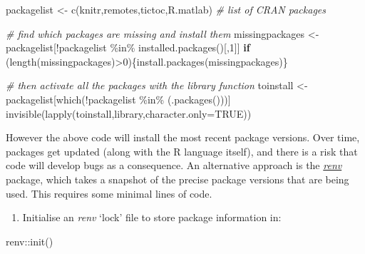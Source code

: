 \documentclass[
]{article}
\newenvironment{Shaded}{\begin{snugshade}}{\end{snugshade}}
\newcommand{\AttributeTok}[1]{\textcolor[rgb]{0.77,0.63,0.00}{#1}}
\newcommand{\CommentTok}[1]{\textcolor[rgb]{0.56,0.35,0.01}{\textit{#1}}}
\newcommand{\ConstantTok}[1]{\textcolor[rgb]{0.00,0.00,0.00}{#1}}
\newcommand{\ControlFlowTok}[1]{\textcolor[rgb]{0.13,0.29,0.53}{\textbf{#1}}}
\newcommand{\DecValTok}[1]{\textcolor[rgb]{0.00,0.00,0.81}{#1}}
\newcommand{\FunctionTok}[1]{\textcolor[rgb]{0.00,0.00,0.00}{#1}}
\newcommand{\NormalTok}[1]{#1}
\newcommand{\OtherTok}[1]{\textcolor[rgb]{0.56,0.35,0.01}{#1}}
\newcommand{\SpecialCharTok}[1]{\textcolor[rgb]{0.00,0.00,0.00}{#1}}
\newcommand{\StringTok}[1]{\textcolor[rgb]{0.31,0.60,0.02}{#1}}
\providecommand{\tightlist}{%
  \setlength{\itemsep}{0pt}\setlength{\parskip}{0pt}}
\begin{document}
\begin{Shaded}
\begin{Highlighting}[]
\NormalTok{packagelist }\OtherTok{\textless{}{-}} \FunctionTok{c}\NormalTok{(}\StringTok{\textquotesingle{}knitr\textquotesingle{}}\NormalTok{,}\StringTok{\textquotesingle{}remotes\textquotesingle{}}\NormalTok{,}\StringTok{\textquotesingle{}tictoc\textquotesingle{}}\NormalTok{,}\StringTok{\textquotesingle{}R.matlab\textquotesingle{}}\NormalTok{) }\CommentTok{\# list of CRAN packages}

\CommentTok{\# find which packages are missing and install them}
\NormalTok{missingpackages }\OtherTok{\textless{}{-}}\NormalTok{ packagelist[}\SpecialCharTok{!}\NormalTok{packagelist }\SpecialCharTok{\%in\%} \FunctionTok{installed.packages}\NormalTok{()[,}\DecValTok{1}\NormalTok{]]}
\ControlFlowTok{if}\NormalTok{ (}\FunctionTok{length}\NormalTok{(missingpackages)}\SpecialCharTok{\textgreater{}}\DecValTok{0}\NormalTok{)\{}\FunctionTok{install.packages}\NormalTok{(missingpackages)\}}

\CommentTok{\# then activate all the packages with the library function}
\NormalTok{toinstall }\OtherTok{\textless{}{-}}\NormalTok{ packagelist[}\FunctionTok{which}\NormalTok{(}\SpecialCharTok{!}\NormalTok{packagelist }\SpecialCharTok{\%in\%}\NormalTok{ (}\FunctionTok{.packages}\NormalTok{()))]}
\FunctionTok{invisible}\NormalTok{(}\FunctionTok{lapply}\NormalTok{(toinstall,library,}\AttributeTok{character.only=}\ConstantTok{TRUE}\NormalTok{))}
\end{Highlighting}
\end{Shaded}

However the above code will install the most recent package versions. Over time, packages get updated (along with the R language itself), and there is a risk that code will develop bugs as a consequence. An alternative approach is the \href{https://rstudio.github.io/renv/articles/renv.html}{\emph{renv}} package, which takes a snapshot of the precise package versions that are being used. This requires some minimal lines of code.

\begin{enumerate}
\def\labelenumi{\arabic{enumi}.}
\tightlist
\item
  Initialise an \emph{renv} `lock' file to store package information in:
\end{enumerate}

\begin{Shaded}
\begin{Highlighting}[]
\NormalTok{renv}\SpecialCharTok{::}\FunctionTok{init}\NormalTok{()}
\end{Highlighting}
\end{Shaded}
\end{document}
